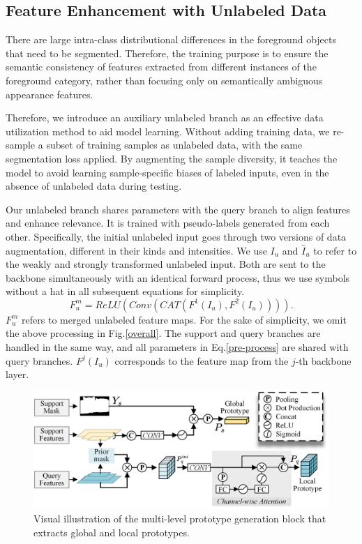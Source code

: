 \documentclass[letterpaper]{article} %
\begin{document}
\subsection{Feature Enhancement with Unlabeled Data}
There are large intra-class distributional differences in the foreground objects that need to be segmented. Therefore, the training purpose is to ensure
the semantic consistency of features extracted from different instances of the foreground category, rather than focusing only on semantically ambiguous appearance features.

Therefore, we introduce an auxiliary unlabeled branch as an effective data utilization method to aid model learning. Without adding training data, we re-sample a subset of training samples as unlabeled data, with the same segmentation loss applied. By augmenting the sample diversity, it teaches the model to avoid learning sample-specific biases of labeled inputs, even in the absence of unlabeled data during testing.

Our unlabeled branch shares parameters with the query branch to align features and enhance relevance. It is trained with pseudo-labels generated from each other. Specifically, the initial unlabeled input goes through two versions of data augmentation, different in their kinds and intensities. We use $I_u$ and $\hat{I}_u$ to refer to the weakly and strongly transformed unlabeled input. Both are sent to the backbone simultaneously with an identical forward process, thus we use symbols without a hat in all subsequent equations for simplicity.
\begin{equation}
\label{pre-process}
F^{m}_u = ReLU(Conv(CAT(F^{1}(I_u),F^{2}(I_u)))).
\end{equation}%
$F^{m}_u$ refers to merged unlabeled feature maps. For the sake of simplicity, we omit the above processing in Fig.\ref{overall}. The support and query branches are handled in the same way, and all parameters in Eq.\ref{pre-process} are shared with query branches. $F^j(I_u)$ corresponds to the feature map from the $j$-th backbone layer.
\begin{figure}
\centering
\includegraphics[width=\linewidth]{generation.pdf}

\caption{Visual illustration of the multi-level prototype generation block that extracts global and local prototypes. }
\label{generation}
\end{figure}
\end{document}
